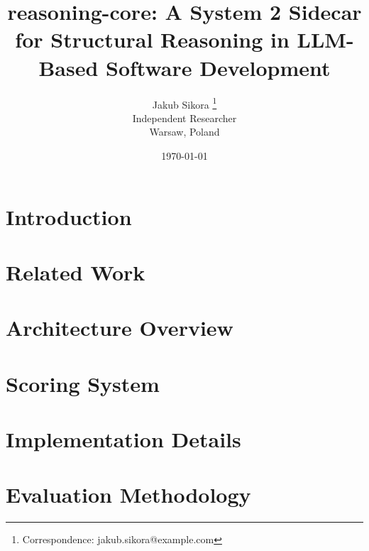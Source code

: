 \documentclass[10pt, twocolumn, letterpaper]{article}
\title{\Large\bfseries reasoning-core: A System 2 Sidecar for Structural Reasoning in LLM-Based Software Development}
\author{
    Jakub Sikora \thanks{Correspondence: jakub.sikora@example.com} \\
    \small Independent Researcher \\
    \small Warsaw, Poland
}
\date{\today}
\begin{document}
\maketitle

\section{Introduction}
\label{sec:introduction}


\section{Related Work}
\label{sec:related}


\section{Architecture Overview}
\label{sec:architecture}


\section{Scoring System}
\label{sec:scoring}


\section{Implementation Details}
\label{sec:implementation}


\section{Evaluation Methodology}
\label{sec:methodology}


\end{document}
